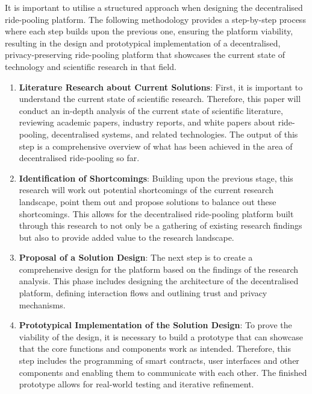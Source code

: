 It is important to utilise a structured approach when designing the decentralised ride-pooling platform. The following methodology provides a step-by-step process where each step builds upon the previous one, ensuring the platform viability, resulting in the design and prototypical implementation of a decentralised, privacy-preserving ride-pooling platform that showcases the current state of technology and scientific research in that field.


\begin{enumerate}

    \item \textbf{Literature Research about Current Solutions}: 
    First, it is important to understand the current state of scientific research. Therefore, this paper will conduct an in-depth analysis of the current state of scientific literature, reviewing academic papers, industry reports, and white papers about ride-pooling, decentralised systems, and related technologies. The output of this step is a comprehensive overview of what has been achieved in the area of decentralised ride-pooling so far.

    \item \textbf{Identification of Shortcomings}: 
    Building upon the previous stage, this research will work out potential shortcomings of the current research landscape, point them out and propose solutions to balance out these shortcomings. This allows for the decentralised ride-pooling platform built through this research to not only be a gathering of existing research findings but also to provide added value to the research landscape.

    \item \textbf{Proposal of a Solution Design}:
    The next step is to create a comprehensive design for the platform based on the findings of the research analysis. This phase includes designing the architecture of the decentralised platform, defining interaction flows and outlining trust and privacy mechanisms. 
    

    \item \textbf{Prototypical Implementation of the Solution Design}: 
    To prove the viability of the design, it is necessary to build a prototype that can showcase that the core functions and components work as intended. Therefore, this step includes the programming of smart contracts, user interfaces and other components and enabling them to communicate with each other. The finished prototype allows for real-world testing and iterative refinement.


\end{enumerate}

